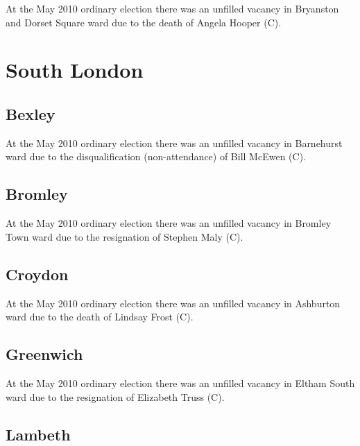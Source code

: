 \begin{resultsiii}
At the May 2010 ordinary election there was an unfilled vacancy in Bryanston and Dorset Square ward due to the death of Angela Hooper (C).

\section{South London}

\subsection{Bexley}

At the May 2010 ordinary election there was an unfilled vacancy in Barnehurst ward due to the disqualification (non-attendance) of Bill McEwen (C).

\subsection{Bromley}

At the May 2010 ordinary election there was an unfilled vacancy in Bromley Town ward due to the resignation of Stephen Maly (C).

\subsection{Croydon}

At the May 2010 ordinary election there was an unfilled vacancy in Ashburton ward due to the death of Lindsay Frost (C).

\subsection{Greenwich}

At the May 2010 ordinary election there was an unfilled vacancy in Eltham South ward due to the resignation of Elizabeth Truss (C).

\subsection{Lambeth}


\end{resultsiii}
